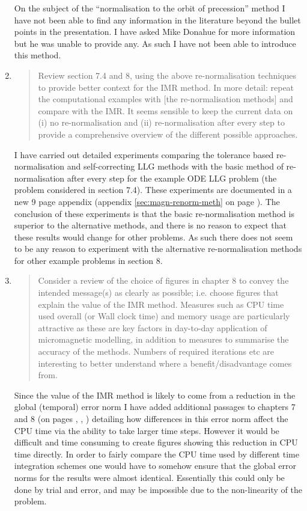\documentclass[12pt,a4paper,pdftex]{article}
\begin{document}
\begin{enumerate}
  On the subject of the ``normalisation to the orbit of precession'' method I have not been able to find any information in the literature beyond the bullet points in the presentation.
  I have asked Mike Donahue for more information but he was unable to provide any.
  As such I have not been able to introduce this method.

\item
  \begin{quotation}
    Review section 7.4 and 8, using the above re-normalisation techniques
    to provide better context for the IMR method. In more detail: repeat
    the computational examples with [the re-normalisation methods] and compare with the IMR.
    It seems sensible to keep the current data on (i) no re-normalisation
    and (ii) re-normalisation after every step to provide a comprehensive
    overview of the different possible approaches.
  \end{quotation}
  I have carried out detailed experiments comparing the tolerance based re-normalisation and self-correcting LLG methods with the basic method of re-normalisation after every step for the example ODE LLG problem (the problem considered in section 7.4).
  These experiments are documented in a new 9 page appendix (appendix \ref{sec:magn-renorm-meth} on page \pageref{sec:magn-renorm-meth}).
  The conclusion of these experiments is that the basic re-normalisation method is superior to the alternative methods, and there is no reason to expect that these results would change for other problems.
  As such there does not seem to be any reason to experiment with the alternative re-normalisation methods for other example problems in section 8.

\item
  \begin{quotation}
    Consider a review of the choice of figures in chapter 8 to convey
    the intended message(s) as clearly as possible; i.e. choose figures
    that explain the value of the IMR method. Measures such as CPU time
    used overall (or Wall clock time) and memory usage are particularly
    attractive as these are key factors in day-to-day application of
    micromagnetic modelling, in addition to measures to summarise the
    accuracy of the methods. Numbers of required iterations etc are
    interesting to better understand where a benefit/disadvantage comes
    from.
  \end{quotation}
  Since the value of the IMR method is likely to come from a reduction in the global (temporal) error norm I have added additional passages to chapters 7 and 8 (on pages \pageref{cpu-correction-0}, \pageref{cpu-correction-1}, \pageref{cpu-correction-2}) detailing how differences in this error norm affect the CPU time via the ability to take larger time steps.
However it would be difficult and time consuming to create figures showing this reduction in CPU time directly. In order to fairly compare the CPU time used by different time integration schemes one would have to somehow ensure that the global error norms for the results were almost identical.
Essentially this could only be done by trial and error, and may be impossible due to the non-linearity of the problem.


\end{enumerate}
\end{document}
